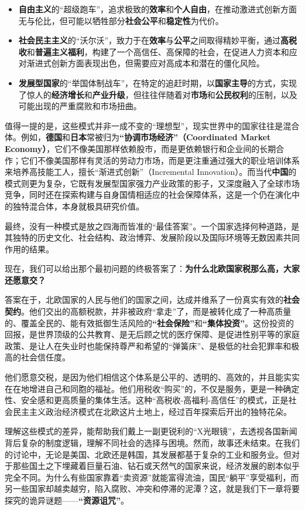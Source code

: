 \begin{itemize}
\item \textbf{自由主义}的“超级跑车”，追求极致的\textbf{效率}和\textbf{个人自由}，在推动激进式创新方面无与伦比，但可能以牺牲部分\textbf{社会公平}和\textbf{稳定性}为代价。
\item \textbf{社会民主主义}的“沃尔沃”，致力于在\textbf{效率}与\textbf{公平}之间取得精妙平衡，通过\textbf{高税收}和\textbf{普遍主义福利}，构建了一个高信任、高保障的社会，在促进人力资本和应对渐进式创新方面表现出色，但需要应对高成本和潜在的僵化风险。
\item \textbf{发展型国家}的“举国体制战车”，在特定的追赶时期，以\textbf{国家主导}的方式，实现了惊人的\textbf{经济增长}和\textbf{产业升级}，但往往伴随着对\textbf{市场}和\textbf{公民权利}的压制，以及可能出现的严重腐败和市场扭曲。
\end{itemize}

值得一提的是，这些模式并非一成不变的“理想型”，现实世界中的国家往往是混合体。例如，\textbf{德国}和\textbf{日本}常被归为\textbf{“协调市场经济”（Coordinated Market Economy）}，它们不像美国那样依赖股市，而是更依赖银行和企业间的长期合作；它们不像美国那样有灵活的劳动力市场，而是更注重通过强大的职业培训体系来培养高技能工人，擅长“渐进式创新”（Incremental Innovation）。而当代\textbf{中国}的模式则更为复杂，它既有发展型国家强力产业政策的影子，又深度融入了全球市场竞争，同时还在探索构建与自身国情相适应的社会保障体系，这是一个仍在演化中的独特混合体，本身就极具研究价值。

最终，没有一种模式是放之四海而皆准的“最佳答案”。一个国家选择何种道路，是其独特的历史文化、社会结构、政治博弈、发展阶段以及国际环境等无数因素共同作用的结果。

现在，我们可以给出那个最初问题的终极答案了：\textbf{为什么北欧国家税那么高，大家还愿意交？}

答案在于，北欧国家的人民与他们的国家之间，达成并维系了一份真实有效的\textbf{社会契约}。他们交出的高额税款，并非被政府“拿走”了，而是被转化成了一种高质量的、覆盖全民的、能有效抵御生活风险的\textbf{“社会保险”}和\textbf{“集体投资”}。这份投资的回报，是世界顶级的公共教育、是无后顾之忧的医疗保障、是促进性别平等的家庭政策、是让人在失业时也能保持尊严和希望的“弹簧床”、是极低的社会犯罪率和极高的社会信任度。

他们愿意交税，是因为他们相信这个体系是公平的、透明的、高效的，并且能实实在在地增进自己和同胞的福祉。他们用税收“购买”的，不仅是服务，更是一种确定性、安全感和更高质量的集体生活。这种“高税收-高福利-高信任”的模式，正是社会民主主义政治经济模式在北欧这片土地上，经过百年探索后开出的独特花朵。

理解这些模式的差异，能帮助我们戴上一副更锐利的“X光眼镜”，去透视各国新闻背后复杂的制度逻辑，理解不同社会的选择与困境。然而，故事还未结束。在我们的讨论中，无论是美国、北欧还是韩国，其发展都基于复杂的工业和服务业。但对于那些国土之下埋藏着巨量石油、钻石或天然气的国家来说，经济发展的剧本似乎完全不同。为什么有些国家靠着“卖资源”就能富得流油，国民“躺平”享受福利，而另一些国家却越卖越穷，陷入腐败、冲突和停滞的泥潭？这，就是我们下一章将要探究的诡异谜题——\textbf{“资源诅咒”}。